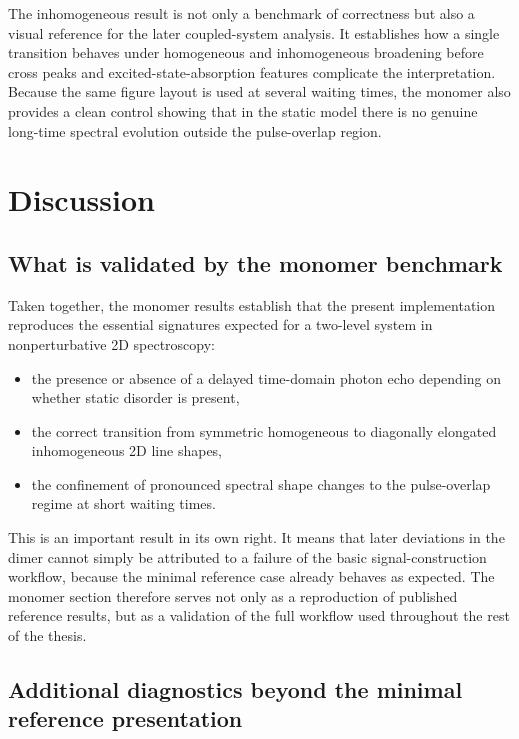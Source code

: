 The inhomogeneous result is not only a benchmark of correctness but also a visual
reference for the later coupled-system analysis.
It establishes how a single transition behaves under homogeneous and
inhomogeneous broadening before cross peaks and excited-state-absorption
features complicate the interpretation.
Because the same figure layout is used at several waiting times, the monomer also
provides a clean control showing that in the static model there is no genuine
long-time spectral evolution outside the pulse-overlap region.

\section{Discussion}

\subsection{What is validated by the monomer benchmark}

Taken together, the monomer results establish that the present implementation
reproduces the essential signatures expected for a two-level system in
nonperturbative 2D spectroscopy:
\begin{itemize}
    \item the presence or absence of a delayed time-domain photon echo depending
    on whether static disorder is present,
    \item the correct transition from symmetric homogeneous to diagonally
    elongated inhomogeneous 2D line shapes,
    \item the confinement of pronounced spectral shape changes to the
    pulse-overlap regime at short waiting times.
\end{itemize}

This is an important result in its own right.
It means that later deviations in the dimer cannot simply be attributed to a
failure of the basic signal-construction workflow, because the minimal reference
case already behaves as expected.
The monomer section therefore serves not only as a reproduction of published
reference results, but as a validation of the full workflow used throughout the
rest of the thesis.

\subsection{Additional diagnostics beyond the minimal reference presentation}


